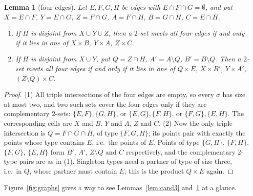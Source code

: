 \documentclass[11pt]{amsart}
\newtheorem{lemma}[theorem]{Lemma}
\theoremstyle{definition}
\theoremstyle{remark}
\begin{document}
\begin{lemma}[four edges]\label{lem:cand4}
Let $E,F,G,H$ be edges with $E\cap F\cap G=\emptyset$, and put $X=E\cap F$, $Y=E\cap G$, $Z=F\cap G$, $A=F\cap H$, $B=G\cap H$, $C=E\cap H$.
\begin{enumerate}
\item If $H$ is disjoint from $X\cup Y\cup Z$, then a $2$-set meets all four edges if and only if it lies in one of $X\times B$, $Y\times A$, $Z\times C$.
\item If $H$ is disjoint from $X\cup Y$, put $Q=Z\cap H$, $A'=A\setminus Q$, $B'=B\setminus Q$. Then a $2$-set meets all four edges if and only if it lies in one of $Q\times E$, $X\times B'$, $Y\times A'$, $(Z\setminus Q)\times C$.
\end{enumerate}
\end{lemma}
\begin{proof}
(1) All triple intersections of the four edges are empty, so every $\sigma$ has size at most two, and two such sets cover the four edges only if they are complementary $2$-sets: $\{E,F\},\{G,H\}$, or $\{E,G\},\{F,H\}$, or $\{F,G\},\{E,H\}$. The corresponding cells are $X$ and $B$, $Y$ and $A$, $Z$ and $C$.
(2) Now the only triple intersection is $Q=F\cap G\cap H$, of type $\{F,G,H\}$; its points pair with exactly the points whose type contains $E$, i.e.\ the points of $E$. Points of type $\{G,H\}$, $\{F,H\}$, $\{F,G\}$, $\{E,H\}$ form $B'$, $A'$, $Z\setminus Q$ and $C$ respectively, and the complementary $2$-type pairs are as in (1). Singleton types need a partner of type of size three, i.e.\ in $Q$, whose partner must contain $E$; this is the product $Q\times E$ again.
\end{proof}

Figure~\ref{fig:graphs} gives a way to see Lemmas~\ref{lem:cand3} and~\ref{lem:cand4} at a glance.
\end{document}
